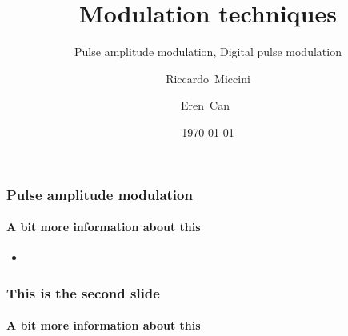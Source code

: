 \documentclass{beamer}
\title{Modulation techniques}
\subtitle{Pulse amplitude modulation, Digital pulse modulation}
\author[Riccardo \and Eren]{Riccardo~Miccini\inst{1} \and Eren~Can~\inst{1}}
\institute[DTU]
{
	\inst{1}
	Technical University of Denmark\\
	Digital Communication
}
\date{\today}
\begin{document}
	\frame{\titlepage}

	\begin{frame}
		\frametitle{Pulse amplitude modulation}
		\framesubtitle{A bit more information about this}
		\begin{itemize}
			\item
		\end{itemize}
	\end{frame}

	\begin{frame}
		\frametitle{This is the second slide}
		\framesubtitle{A bit more information about this}
	\end{frame}
\end{document}
